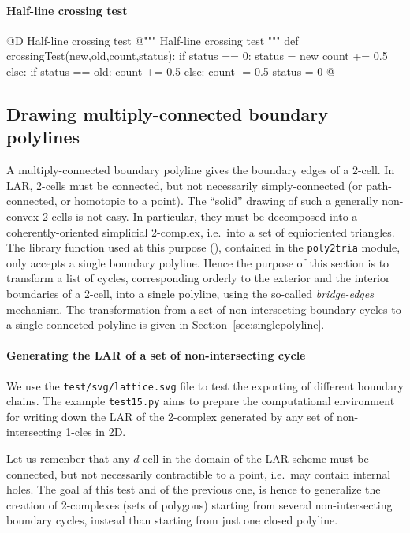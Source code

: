 \documentclass[11pt,oneside]{article}    %
\begin{document}
\paragraph{Half-line crossing test}
@D Half-line crossing test 
@{""" Half-line crossing test """
def crossingTest(new,old,count,status):
    if status == 0:
        status = new
        count += 0.5
    else:
        if status == old: count += 0.5
        else: count -= 0.5
        status = 0
@}

\subsection{Drawing multiply-connected boundary polylines}

A multiply-connected boundary polyline gives the boundary edges of a 2-cell.
In LAR, 2-cells must be connected, but not necessarily simply-connected (or path-connected, or homotopic to a point). The ``solid'' drawing of such a generally non-convex 2-cells is not easy.
In particular, they must be decomposed into a coherently-oriented simplicial 2-complex, i.e.~into a set of equioriented triangles. The library function used at this purpose (), contained in the \texttt{poly2tria} module, only accepts a single boundary polyline. Hence the purpose of this section is to transform a list of cycles, corresponding orderly to the exterior and the interior boundaries of a 2-cell, into a single polyline, using the so-called \emph{bridge-edges}~\cite{Yamaguchi:85} mechanism. The transformation from a set of non-intersecting boundary cycles to a single connected polyline is given in Section~\ref{sec:singlepolyline}.


\paragraph{Generating the LAR of a set of non-intersecting cycle}

We use the \texttt{test/svg/lattice.svg} file to test the exporting of different boundary chains. The example \texttt{test15.py} aims to prepare the computational environment for writing down the LAR of the 2-complex generated by any set of non-intersecting 1-cles in 2D.

Let us remenber that any $d$-cell in the domain of the LAR scheme must be connected, but not necessarily contractible to a point, i.e.~may contain internal holes.
The goal af this test and of the previous one, is hence to generalize the creation of 2-complexes (sets of polygons) starting from several non-intersecting boundary cycles, instead than starting from just one closed polyline.
\end{document}
